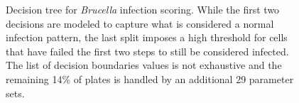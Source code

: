 \renewcommand{\arraystretch}{1.5}
\setlength{\tabcolsep}{0.35em}
\begin{figure}[b]
  \centering

  \vspace{5mm}
  \footnotesize
  

  \vspace{5mm}
  \caption[Decision tree for \textit{Brucella} infection scoring.]{Decision tree for \textit{Brucella} infection scoring. While the first two decisions are modeled to capture what is considered a normal infection pattern, the last split imposes a high threshold for cells that have failed the first two steps to still be considered infected. The list of decision boundaries values is not exhaustive and the remaining 14\% of plates is handled by an additional 29 parameter sets.}
\end{figure}

